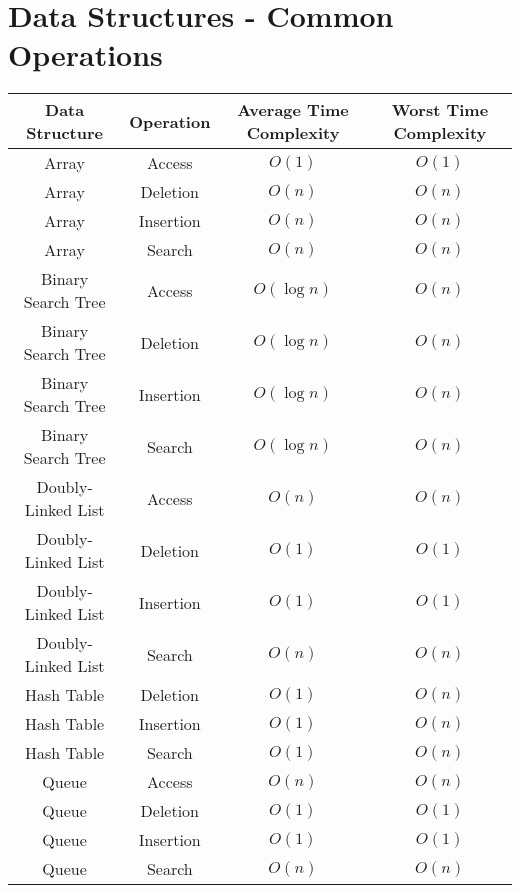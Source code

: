 \documentclass{article}
\begin{document}

\newpage
\section*{Data Structures - Common Operations}

\begin{table}[ht]
	\centering
	\scriptsize
	\begin{tabular}{c ccc}
		Data Structure & Operation & Average Time Complexity & Worst Time Complexity \\
		\hline
		Array & Access & $O(1)$ & $O(1)$  \\
		Array & Deletion & $O(n)$ & $O(n)$  \\
		Array & Insertion & $O(n)$ & $O(n)$  \\
		Array & Search & $O(n)$ & $O(n)$ \\
		
		Binary Search Tree & Access & $O(\log{n})$ & $O(n)$ \\
		Binary Search Tree & Deletion & $O(\log{n})$ & $O(n)$ \\
		Binary Search Tree & Insertion & $O(\log{n})$ & $O(n)$ \\
		Binary Search Tree & Search & $O(\log{n})$ & $O(n)$ \\
		
		Doubly-Linked List & Access & $O(n)$ & $O(n)$  \\
		Doubly-Linked List & Deletion & $O(1)$ & $O(1)$  \\
		Doubly-Linked List & Insertion & $O(1)$ & $O(1)$  \\
		Doubly-Linked List & Search & $O(n)$ & $O(n)$ \\
		
		Hash Table & Deletion & $O(1)$ & $O(n)$ \\
		Hash Table & Insertion & $O(1)$ & $O(n)$ \\
		Hash Table & Search & $O(1)$ & $O(n)$ \\
		
		Queue & Access & $O(n)$ & $O(n)$  \\
		Queue & Deletion & $O(1)$ & $O(1)$  \\
		Queue & Insertion & $O(1)$ & $O(1)$  \\
		Queue& Search & $O(n)$ & $O(n)$  \\
		

\end{tabular}
\end{table}
\end{document}

